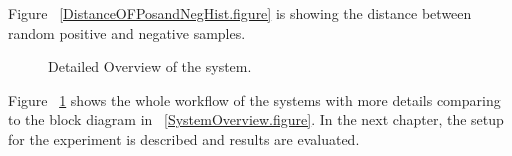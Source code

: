 Figure ~\ref{DistanceOFPosandNegHist.figure} is showing the distance between random positive and negative samples.


\begin{figure}[t]
  \caption[Detailed Overview of the system]
  {Detailed Overview of the system.}
  \label{DetailedOverview.figure}
\end{figure}

Figure ~\ref{DetailedOverview.figure} shows the whole workflow of the systems with more details comparing to the block diagram in ~\ref{SystemOverview.figure}.
In the next chapter, the setup for the experiment is described and results are evaluated.


% 
% 
% 
% 
% 
